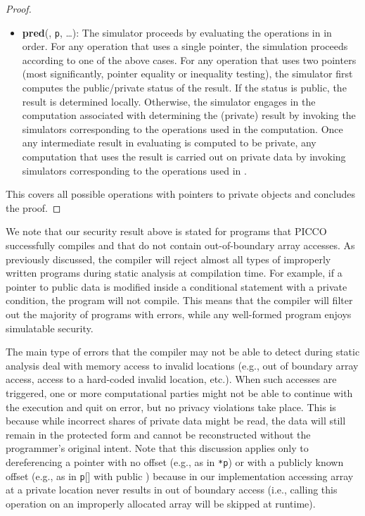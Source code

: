 \documentclass[11pt]{article}
\begin{document}
\begin{proof}
\begin{itemize}
  \item \textbf{pred}(, \texttt{p}, {\ldots}): The simulator proceeds
    by evaluating the operations in  in order. For any operation that
    uses a single pointer, the simulation proceeds according to one of the
    above cases. For any operation that uses two pointers (most
    significantly, pointer equality or inequality testing), the simulator
    first computes the public/private status of the result. If the status is
    public, the result is determined locally. Otherwise, the simulator
    engages in the computation associated with determining the (private)
    result by invoking the simulators corresponding to the operations used
    in the computation. Once any intermediate result in evaluating  is
    computed to be private, any computation that uses the result is carried
    out on private data by invoking simulators corresponding to the
    operations used in .
\end{itemize}
This covers all possible operations with pointers to private objects and
concludes the proof. 
\end{proof}

We note that our security result above is stated for programs that PICCO
successfully compiles and that do not contain out-of-boundary array accesses.
As previously discussed, the compiler will reject almost all 
types of improperly written programs during static analysis at
compilation time. For example, if a pointer to public data is modified
inside a conditional statement with a private condition, the program
will not compile. This means that the compiler will filter out the
majority of programs with errors, while any well-formed program enjoys
simulatable security.

The main type of errors that the compiler may not be able to detect during
static analysis deal with memory access to invalid locations (e.g., out of
boundary array access, access to a hard-coded invalid location, etc.). When
such accesses are triggered, one or more computational parties might not be
able to continue with the execution and quit on error, but no privacy
violations take place. This is because while incorrect shares of private
data might be read, the data will still remain in the protected form and
cannot be reconstructed without the programmer's original intent. Note that
this discussion applies only to dereferencing a pointer with no offset
(e.g., as in \texttt{*p}) or with a publicly known offset (e.g., as in
\texttt{p}[] with public ) because in our implementation accessing
array at a private location never results in out of boundary access (i.e.,
calling this operation on an improperly allocated array will be skipped at
 runtime).
\end{document}
